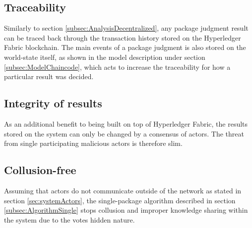 \subsection{Traceability}
\label{subsec:AnalysisTraceability}

Similarly to section \ref{subsec:AnalysisDecentralized}, any package judgment result can be traced back through the transaction history stored on the Hyperledger Fabric blockchain. The main events of a package judgment is also stored on the world-state itself, as shown in the model description under section \ref{subsec:ModelChaincode}, which acts to increase the traceability for how a particular result was decided.

\subsection{Integrity of results}
\label{subsec:AnalysisIntegrity}

As an additional benefit to being built on top of Hyperledger Fabric, the results stored on the system can only be changed by a consensus of actors. The threat from single participating malicious actors is therefore slim.

\subsection{Collusion-free}
\label{subsec:AnalysisCollusionFree}

Assuming that actors do not communicate outside of the network as stated in section \ref{sec:systemActors}, the single-package algorithm described in section \ref{subsec:AlgorithmSingle} stops collusion and improper knowledge sharing within the system due to the votes hidden nature.